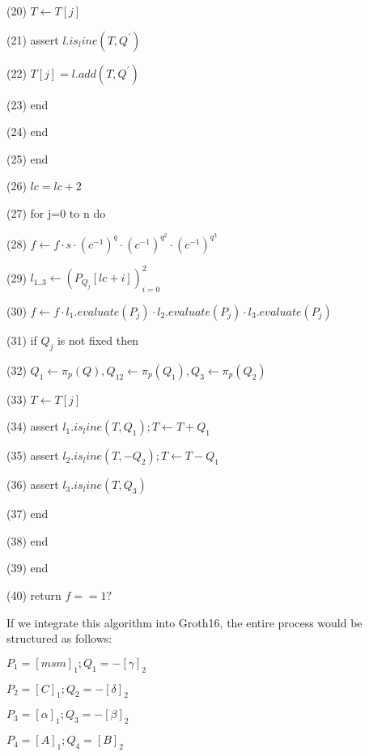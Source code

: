 (20) \indent \indent \indent $\displaystyle T \leftarrow T[j] $ 

(21) \indent \indent \indent assert $\displaystyle l.is_line(T, Q^{'}) $ 

(22) \indent \indent \indent $\displaystyle T[j] = l.add(T, Q^{'}) $ 

(23) \indent \indent \indent end 

(24) \indent \indent end 

(25) \indent end 

(26) \indent $\displaystyle lc = lc + 2 $ 

(27) \indent for j=0 to n do 

(28) \indent \indent $\displaystyle f \leftarrow f \cdot s \cdot (c^{-1})^q \cdot (c^{-1})^{q^2} \cdot (c^{-1})^{q^3} $ 

(29) \indent \indent $\displaystyle l_{1..3} \leftarrow (P_{Q_j}[lc+i])_{i=0}^2 $ 

(30) \indent \indent $\displaystyle f \leftarrow f \cdot l_1.evaluate(P_{j}) \cdot l_2.evaluate(P_{j}) \cdot l_3.evaluate(P_{j}) $ 

(31) \indent \indent if $Q_j$ is not fixed then 

(32) \indent \indent \indent $\displaystyle Q_1 \leftarrow \pi_p(Q), Q_12\leftarrow \pi_p(Q_1), Q_3 \leftarrow \pi_p(Q_2) $ 

(33) \indent \indent \indent $\displaystyle T \leftarrow T[j] $ 

(34) \indent \indent \indent assert $\displaystyle l_1.is_line(T, Q_1); T \leftarrow T + Q_1 $ 

(35) \indent \indent \indent assert $\displaystyle l_2.is_line(T, -Q_2); T \leftarrow T - Q_1 $ 

(36) \indent \indent \indent assert $\displaystyle l_3.is_line(T, Q_3) $ 

(37) \indent \indent end 

(38) \indent end 

(39) end 

(40) return $\displaystyle f == 1? $ 


If we integrate this algorithm into Groth16, the entire process would be structured as follows:	

$\displaystyle P_1 = [msm]_1; Q_1 = -[\gamma]_2 $

$\displaystyle P_2 = [C]_1; Q_2 = -[\delta]_2 $

$\displaystyle P_3 = [\alpha]_1; Q_3 = -[\beta]_2 $

$\displaystyle P_4 = [A]_1; Q_4 = [B]_2 $


